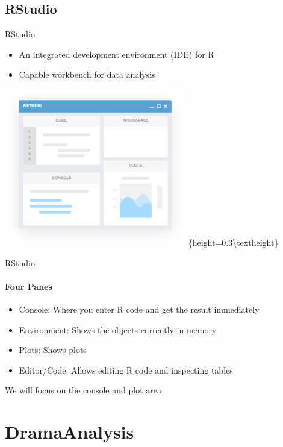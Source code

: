 \documentclass[ignorenonframetext,]{beamer}
\providecommand{\tightlist}{%
  \setlength{\itemsep}{0pt}\setlength{\parskip}{0pt}}
\begin{document}
\hypertarget{rstudio}{%
\subsection{RStudio}\label{rstudio}}

\begin{frame}{RStudio}
\protect\hypertarget{rstudio-1}{}

\begin{itemize}
\tightlist
\item
  An integrated development environment (IDE) for R
\item
  Capable workbench for data analysis
\end{itemize}

\includegraphics{rstudio-300x260.png}
\{height=0.3\textbackslash{}textheight\}

\end{frame}

\begin{frame}{RStudio}
\protect\hypertarget{rstudio-2}{}

\framesubtitle{Four Panes}

\begin{itemize}
\tightlist
\item
  Console: Where you enter R code and get the result immediately
\item
  Environment: Shows the objects currently in memory
\item
  Plots: Shows plots
\item
  Editor/Code: Allows editing R code and inspecting tables
\end{itemize}

We will focus on the console and plot area

\end{frame}

\hypertarget{dramaanalysis}{%
\section{DramaAnalysis}\label{dramaanalysis}}
\end{document}
